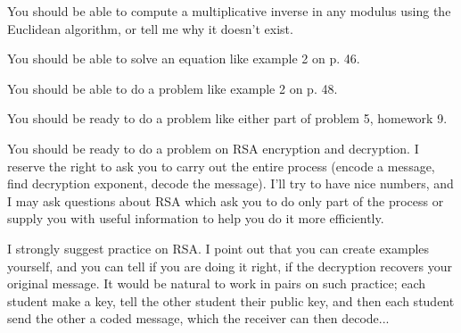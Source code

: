 \documentclass[12pt]{article}
\begin{document}
\begin{description}
You should be able to compute a multiplicative inverse in any modulus using the Euclidean algorithm, or tell me why it doesn't exist.

You should be able to solve an equation like example 2 on p. 46.

You should be able to do a problem like example 2 on p. 48.

You should be ready to do a problem like either part of problem 5, homework 9.

You should be ready to do a problem on RSA encryption and decryption.  I reserve the right to ask you to carry out the entire process (encode a message, find decryption exponent, decode the message).  I'll try to have nice numbers, and I may ask questions about RSA which ask you to do only part of the process or supply you with useful information to help you do it more efficiently.

I strongly suggest practice on RSA.  I point out that you can create examples yourself, and you can tell if you are doing it right, if the decryption recovers your original message.  It would be natural to work in pairs on such practice;  each student make a key, tell the other student their public key, and then each student send the other a coded message, which the receiver can then decode...






\end{description}
\end{document}
